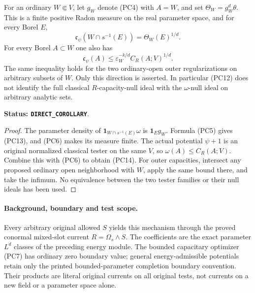 \begin{corollary}
\label{cor:r12-parameter-energy-capacity-bands}
For an ordinary $W\Subset V$, let $g_W$ denote (PC4) with
$A=W$, and set $\Theta_W=g_W^d\theta$. This is a finite positive
Radon measure on the real parameter space, and for every Borel $E$,
\[
         \mathfrak c_\psi(W\cap s^{-1}(E))=\Theta_W(E)^{1/d}.
                                                                    \tag{PC13}
\]
For every Borel $A\subset W$ one also has
\[
          \mathfrak c_\psi(A)
               \le\varepsilon_W^{-k/d} C_R(A;V)^{1/d}.
                                                                    \tag{PC14}
\]
The same inequality holds for the two ordinary-open outer
regularizations on arbitrary subsets of $W$. Only this direction
is asserted. In particular (PC12) does not identify the full
classical $R$-capacity-null ideal with the $\omega$-null ideal
on arbitrary analytic sets.
\end{corollary}

\noindent\textbf{Status: \texttt{DIRECT\_COROLLARY}}.

\begin{proof}
The parameter density of $\mathbf1_{W\cap s^{-1}(E)}\omega$
is $\mathbf1_Eg_W$. Formula (PC5) gives (PC13), and (PC6)
makes its measure finite. The actual potential $\psi+1$ is
an original normalized classical tester on the same $V$, so
$\omega(A)\le C_R(A;V)$. Combine this with (PC6) to obtain
(PC14). For outer capacities, intersect any proposed ordinary
open neighborhood with $W$, apply the same bound there, and
take the infimum. No equivalence between the two tester
families or their null ideals has been used.
\end{proof}

\paragraph{Background, boundary and test scope.}
Every arbitrary original allowed $S$ yields this mechanism
through the proved conormal mixed-slot current
$R=\Omega_s\wedge S$. The coefficients are the exact
parameter $L^d$ classes of the preceding energy module.
The bounded capacitary optimizer (PC7) has ordinary zero
boundary value; general energy-admissible potentials retain
only the printed bounded-parameter completion boundary convention.
Their products are literal original currents on all original
tests, not currents on a new field or a parameter space alone.

